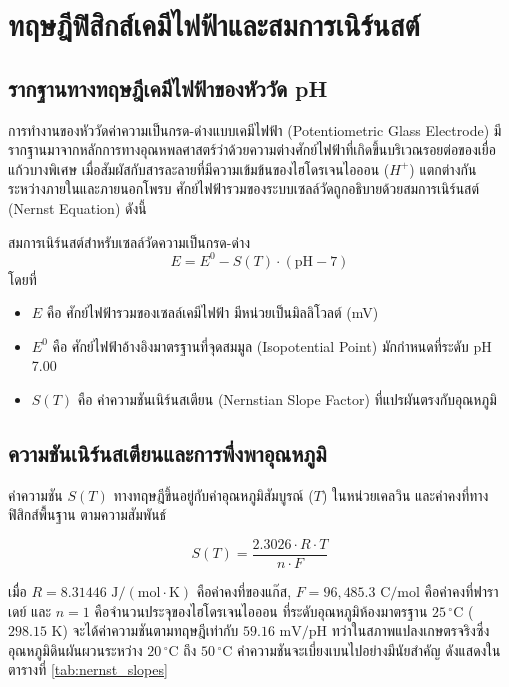 \chapter{ทฤษฎีฟิสิกส์เคมีไฟฟ้าและสมการเนิร์นสต์}
\label{chap:physics}

\section{รากฐานทางทฤษฎีเคมีไฟฟ้าของหัววัด pH}
การทำงานของหัววัดค่าความเป็นกรด-ด่างแบบเคมีไฟฟ้า (Potentiometric Glass Electrode) มีรากฐานมาจากหลักการทางอุณหพลศาสตร์ว่าด้วยความต่างศักย์ไฟฟ้าที่เกิดขึ้นบริเวณรอยต่อของเยื่อแก้วบางพิเศษ เมื่อสัมผัสกับสารละลายที่มีความเข้มข้นของไฮโดรเจนไอออน ($H^+$) แตกต่างกันระหว่างภายในและภายนอกโพรบ ศักย์ไฟฟ้ารวมของระบบเซลล์วัดถูกอธิบายด้วยสมการเนิร์นสต์ (Nernst Equation) ดังนี้

\begin{formulabox}{สมการเนิร์นสต์สำหรับเซลล์วัดความเป็นกรด-ด่าง}
\begin{equation}
E = E^0 - S(T) \cdot (\text{pH} - 7)
\label{eq:nernst}
\end{equation}
โดยที่
\begin{itemize}
    \item $E$ คือ ศักย์ไฟฟ้ารวมของเซลล์เคมีไฟฟ้า มีหน่วยเป็นมิลลิโวลต์ (mV)
    \item $E^0$ คือ ศักย์ไฟฟ้าอ้างอิงมาตรฐานที่จุดสมมูล (Isopotential Point) มักกำหนดที่ระดับ pH 7.00
    \item $S(T)$ คือ ค่าความชันเนิร์นสเตียน (Nernstian Slope Factor) ที่แปรผันตรงกับอุณหภูมิ
\end{itemize}
\end{formulabox}

\section{ความชันเนิร์นสเตียนและการพึ่งพาอุณหภูมิ}
ค่าความชัน $S(T)$ ทางทฤษฎีขึ้นอยู่กับค่าอุณหภูมิสัมบูรณ์ ($T$) ในหน่วยเคลวิน และค่าคงที่ทางฟิสิกส์พื้นฐาน ตามความสัมพันธ์

\begin{equation}
S(T) = \frac{2.3026 \cdot R \cdot T}{n \cdot F}
\label{eq:slope}
\end{equation}

เมื่อ $R = 8.31446\text{ J}/(\text{mol}\cdot\text{K})$ คือค่าคงที่ของแก๊ส, $F = 96,485.3\text{ C/mol}$ คือค่าคงที่ฟาราเดย์ และ $n = 1$ คือจำนวนประจุของไฮโดรเจนไอออน ที่ระดับอุณหภูมิห้องมาตรฐาน $25\,^\circ\text{C}$ ($298.15\text{ K}$) จะได้ค่าความชันตามทฤษฎีเท่ากับ $59.16\text{ mV/pH}$ ทว่าในสภาพแปลงเกษตรจริงซึ่งอุณหภูมิดินผันผวนระหว่าง $20\,^\circ\text{C}$ ถึง $50\,^\circ\text{C}$ ค่าความชันจะเบี่ยงเบนไปอย่างมีนัยสำคัญ ดังแสดงในตารางที่ \ref{tab:nernst_slopes}

